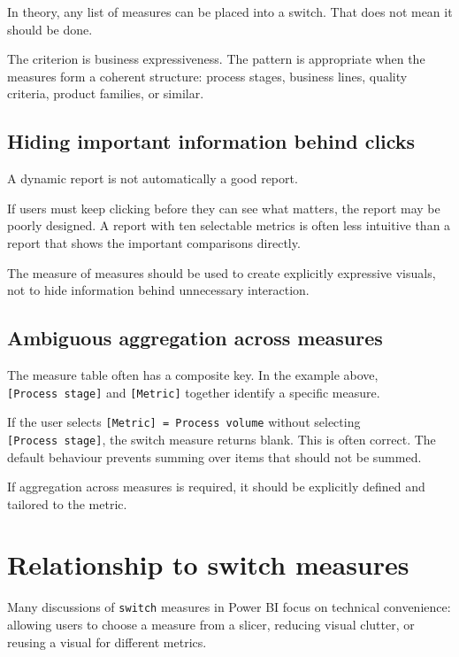 \documentclass[10pt,openany,10pt]{book}
\begin{document}
In theory, any list of measures can be placed into a switch. That does
not mean it should be done.

The criterion is business expressiveness. The pattern is appropriate
when the measures form a coherent structure: process stages, business
lines, quality criteria, product families, or similar.

\subsection{Hiding important information behind
clicks}\label{hiding-important-information-behind-clicks}

A dynamic report is not automatically a good report.

If users must keep clicking before they can see what matters, the report
may be poorly designed. A report with ten selectable metrics is often
less intuitive than a report that shows the important comparisons
directly.

The measure of measures should be used to create explicitly expressive
visuals, not to hide information behind unnecessary interaction.

\subsection{Ambiguous aggregation across
measures}\label{ambiguous-aggregation-across-measures}

The measure table often has a composite key. In the example above,
\texttt{{[}Process\ stage{]}} and \texttt{{[}Metric{]}} together
identify a specific measure.

If the user selects \texttt{{[}Metric{]}\ =\ Process\ volume} without
selecting \texttt{{[}Process\ stage{]}}, the switch measure returns
blank. This is often correct. The default behaviour prevents summing
over items that should not be summed.

If aggregation across measures is required, it should be explicitly
defined and tailored to the metric.

\section{Relationship to switch
measures}\label{relationship-to-switch-measures}

Many discussions of \texttt{switch} measures in Power BI focus on
technical convenience: allowing users to choose a measure from a slicer,
reducing visual clutter, or reusing a visual for different metrics.
\end{document}
